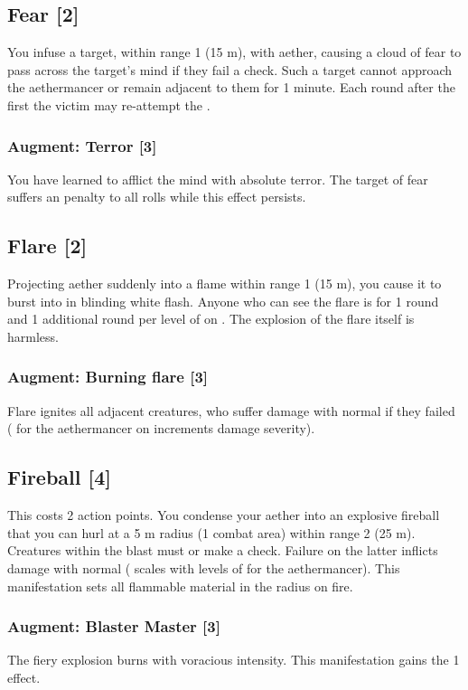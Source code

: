 \subsection{Fear [2]}
You infuse a target, within range 1 (15 m), with aether, causing a cloud of fear to pass across the target's mind if they fail a  check. Such a target cannot approach the aethermancer or remain adjacent to them for 1 minute. Each round after the first the victim may re-attempt the . 
\subsubsection{Augment: Terror [3]}
You have learned to afflict the mind with absolute terror. The target of fear suffers an  penalty to all rolls while this effect persists. 



\subsection{Flare [2]}
\label{spell:flare}
Projecting aether suddenly into a flame within range 1 (15 m), you cause it to burst into in blinding white flash. Anyone who can see the flare is  for 1 round and 1 additional round per level of  on . The explosion of the flare itself is harmless.
\subsubsection{Augment: Burning flare [3]}
Flare ignites all adjacent creatures, who suffer damage with normal  if they failed  ( for the aethermancer on  increments damage severity).


\subsection{Fireball [4]}
This costs 2 action points. You condense your aether into an explosive fireball that you can hurl at a 5 m radius (1 combat area) within range 2 (25 m). Creatures within the blast must  or make a  check. Failure on the latter inflicts damage with normal  ( scales with levels of  for the aethermancer). This manifestation sets all flammable material in the radius on fire.
\subsubsection{Augment: Blaster Master [3]}
The fiery explosion burns with voracious intensity. This manifestation gains the  1 effect.


